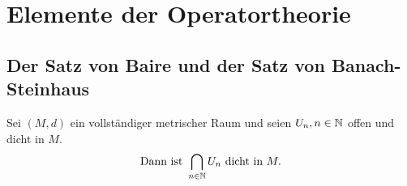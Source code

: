 
\chapter*{Elemente der Operatortheorie}  \setcounter{section}{8}

\section{Der Satz von Baire und der Satz von Banach-Steinhaus}

\begin{satz}
	Sei $(M, d)$ ein vollständiger metrischer Raum und seien $U_{n}, n \in \mathbb{N}$ offen und dicht in $M$.
	\[ \text{Dann ist } \bigcap_{n \in \mathbb{N}} U_{n} \text{ dicht in } M. \]
\end{satz}


